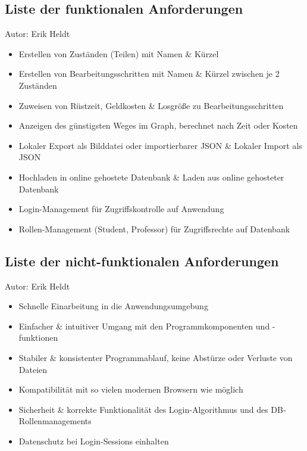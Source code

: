 \documentclass[twoside]{report}
\begin{document}



\subsection{Liste der funktionalen Anforderungen}
{\small Autor: Erik Heldt}

\begin{itemize}
  \item Erstellen von Zuständen (Teilen) mit Namen \& Kürzel
  \item Erstellen von Bearbeitungsschritten mit Namen \& Kürzel zwischen je 2 Zuständen
  \item Zuweisen von Rüstzeit, Geldkosten \& Losgröße zu Bearbeitungsschritten
  \item Anzeigen des günstigsten Weges im Graph, berechnet nach Zeit oder Kosten
  \item Lokaler Export als Bilddatei oder importierbarer JSON \& Lokaler Import als JSON
  \item Hochladen in online gehostete Datenbank \& Laden aus online gehosteter Datenbank
  \item Login-Management für Zugriffskontrolle auf Anwendung
  \item Rollen-Management (Student, Professor) für Zugriffsrechte auf Datenbank
\end{itemize}

%
%
% 

\subsection{Liste der nicht-funktionalen Anforderungen}
{\small Autor: Erik Heldt}

\begin{itemize}
  \item Schnelle Einarbeitung in die Anwendungsumgebung
  \item Einfacher \& intuitiver Umgang mit den Programmkomponenten und -funktionen
  \item Stabiler \& konsistenter Programmablauf, keine Abstürze oder Verluste von Dateien
  \item Kompatibilität mit so vielen modernen Browsern wie möglich
  \item Sicherheit \& korrekte Funktionalität des Login-Algorithmus und des DB-Rollenmanagements
  \item Datenschutz bei Login-Sessions einhalten
\end{itemize}
\end{document}
